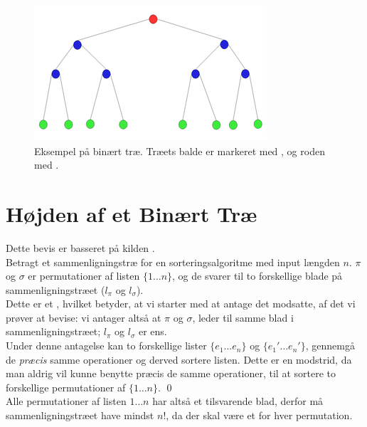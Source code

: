\begin{figure}
	\begin{center}
		\includegraphics[scale=1]{../img/binary_tree.png}
	\end{center}
	\caption{Eksempel på binært træ. Træets balde er markeret med , og roden med . \cite{binaert-trae}}
	\label{fig:Eksempel på binært træ}
\end{figure} 
\section{Højden af et Binært Træ}
\label{sec:Højden af et Binært Træ}

Dette bevis er basseret på kilden \cite[s. 109]{aogd}.\\


Betragt et sammenligningstræ for en sorteringsalgoritme med input længden $n$. $\pi$ og $\sigma$ er permutationer af listen $\{1 \dots n\}$, og de svarer til to forskellige blade på sammenligningstræet ($l_{\pi}$ og $l_{\sigma}$).\\

Dette er et , hvilket betyder, at vi starter med at antage det modsatte, af det vi prøver at bevise: vi antager altså at $\pi$ og $\sigma$, leder til samme blad i sammenligningstræet; $l_{\pi}$ og $l_{\sigma}$ er ens.\\

Under denne antagelse kan to forskellige lister $\{e_1 \dots e_n\}$ og $\{e_1' \dots e_n'\}$, gennemgå de \emph{præcis} samme operationer og derved sortere listen. Dette er en modstrid, da man aldrig vil kunne benytte præcis de samme operationer, til at sortere to forskellige permutationer af $\{1 \dots n\}$. \qed\\


Alle permutationer af listen ${1 \dots n}$ har altså et tilsvarende blad, derfor må sammenligningstræet have mindst $n!$, da der skal være et for hver permutation.\\

